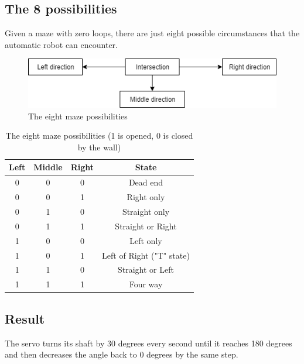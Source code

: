 \documentclass{article}
\begin{document}
\subsection{The 8 possibilities}
Given a maze with zero loops, there are just eight possible circumstances that the automatic robot can encounter.
\begin{figure}[h!]
	\centering
		\includegraphics[width=400pt]{pic1.png}
	\caption{The eight maze possibilities}
	
\end{figure}
\begin{table}[h!]
	\begin{center}
		\begin{tabular}{||c c c |c||} 
			\hline
			Left & Middle & Right & State \\
			\hline\hline
			0 & 0 & 0 & Dead end \\ 
			\hline
			0 & 0 & 1 & Right only \\ 
			\hline
			0 & 1 & 0 & Straight only \\ 
			\hline
			0 & 1 & 1 & Straight or Right\\ 
			\hline
			1 & 0 & 0 & Left only \\ 
			\hline
			1 & 0 & 1 & Left of Right ("T" state)\\ 
			\hline
			1 & 1 & 0 & Straight or Left \\ 
			\hline
			1 & 1 & 1 & Four way \\ 
			\hline
		\end{tabular}
		\caption{The eight maze possibilities (1 is opened, 0 is closed by the wall)}
		\label{table:1}
	\end{center}

\end{table}
\subsection{Result}
The servo turns its shaft by 30 degrees every second until it reaches 180 degrees and then decreases the angle back to 0 degrees by the same step.
\end{document}
